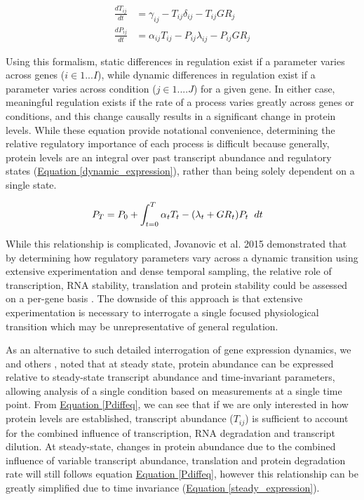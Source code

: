 \begin{subequations}
\begin{align}
\frac{dT_{ij}}{dt} &= \gamma_{ij} - T_{ij}\delta_{ij} - T_{ij}GR_{j}\label{Tdiffeq}\\
\frac{dP_{ij}}{dt} &= \alpha_{ij}T_{ij} - P_{ij}\lambda_{ij} - P_{ij}GR_{j}\label{Pdiffeq}
\end{align}
\end{subequations}

Using this formalism, static differences in regulation exist if a parameter varies across genes ($i \in 1 ... I$), while dynamic differences in regulation exist if a parameter varies across condition ($j \in 1....J$) for a given gene.  In either case, meaningful regulation exists if the rate of a process varies greatly across genes or conditions, and this change causally results in a significant change in protein levels. While these equation provide notational convenience, determining the relative regulatory importance of each process is difficult because generally, protein levels are an integral over past transcript abundance and regulatory states (\hyperref[dynamic_expression]{Equation \ref{dynamic_expression}}), rather than being solely dependent on a single state.

\begin{align}
P_{T} &= P_{0} + \int_{t = 0}^{T} \alpha_{t} T_{t} - (\lambda_{t} + GR_{t}) P_{t} \hspace{2mm} dt \label{dynamic_expression}
\end{align}

While this relationship is complicated, Jovanovic et al. 2015 demonstrated that by determining how regulatory parameters vary across a dynamic transition using extensive experimentation and dense temporal sampling, the relative role of transcription, RNA stability, translation and protein stability could be assessed on a per-gene basis \cite{Jovanovic:2015hp}. The downside of this approach is that extensive experimentation is necessary to interrogate a single focused physiological transition which may be unrepresentative of general regulation.

As an alternative to such detailed interrogation of gene expression dynamics, we and others \cite{Belle:2006hv, Csardi:2015kx}, noted that at steady state, protein abundance can be expressed relative to steady-state transcript abundance and time-invariant parameters, allowing analysis of a single condition based on measurements at a single time point.  From \hyperref[Pdiffeq]{Equation \ref{Pdiffeq}}, we can see that if we are only interested in how protein levels are established, transcript abundance ($T_{ij}$) is sufficient to account for the combined influence of transcription, RNA degradation and transcript dilution. At steady-state, changes in protein abundance due to the combined influence of variable transcript abundance, translation and protein degradation rate will still follows equation \hyperref[Pdiffeq]{Equation \ref{Pdiffeq}}, however this relationship can be greatly simplified due to time invariance (\hyperref[steady_expression]{Equation \ref{steady_expression}}).

